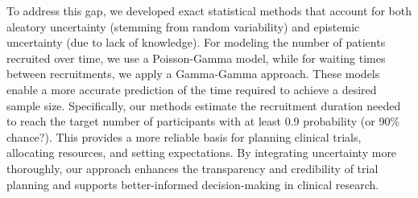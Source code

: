 \documentclass[11pt,a4paper,twoside]{book}
\begin{document}
To address this gap, we developed exact statistical methods that account for both aleatory uncertainty (stemming from random variability) and epistemic uncertainty (due to lack of knowledge). For modeling the number of patients recruited over time, we use a Poisson-Gamma model, while for waiting times between recruitments, we apply a Gamma-Gamma approach. These models enable a more accurate prediction of the time required to achieve a desired sample size. Specifically, our methods estimate the recruitment duration needed to reach the target number of participants with at least 0.9 probability (or 90\% chance?). This provides a more reliable basis for planning clinical trials, allocating resources, and setting expectations. By integrating uncertainty more thoroughly, our approach enhances the transparency and credibility of trial planning and supports better-informed decision-making in clinical research.

\vspace{2em}  %
















\appendix



\cleardoublepage
{}
{}


 


\cleardoublepage
\end{document}
